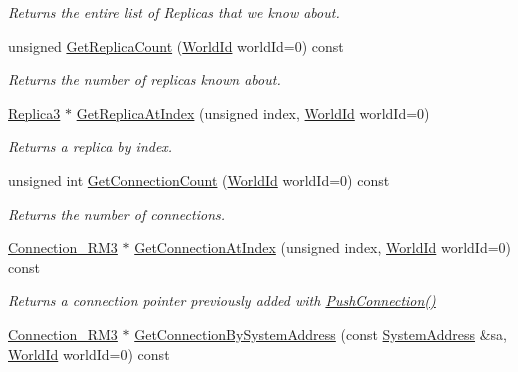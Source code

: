 \begin{DoxyCompactItemize}
\begin{DoxyCompactList}\small\item\em Returns the entire list of Replicas that we know about. \end{DoxyCompactList}\item 
unsigned \hyperlink{class_rak_net_1_1_replica_manager3_af15943bf2667aadeff0a2e7a7f79629f}{Get\-Replica\-Count} (\hyperlink{group___r_e_p_l_i_c_a___m_a_n_a_g_e_r___g_r_o_u_p3_ga44b59af8e882248f61aa41d8ace38bf7}{World\-Id} world\-Id=0) const 
\begin{DoxyCompactList}\small\item\em Returns the number of replicas known about. \end{DoxyCompactList}\item 
\hyperlink{class_rak_net_1_1_replica3}{Replica3} $\ast$ \hyperlink{class_rak_net_1_1_replica_manager3_ae090d01f6e02425ebca4c1988f309de7}{Get\-Replica\-At\-Index} (unsigned index, \hyperlink{group___r_e_p_l_i_c_a___m_a_n_a_g_e_r___g_r_o_u_p3_ga44b59af8e882248f61aa41d8ace38bf7}{World\-Id} world\-Id=0)
\begin{DoxyCompactList}\small\item\em Returns a replica by index. \end{DoxyCompactList}\item 
unsigned int \hyperlink{class_rak_net_1_1_replica_manager3_ad5335d9001f0ae1b0278f671eb455956}{Get\-Connection\-Count} (\hyperlink{group___r_e_p_l_i_c_a___m_a_n_a_g_e_r___g_r_o_u_p3_ga44b59af8e882248f61aa41d8ace38bf7}{World\-Id} world\-Id=0) const 
\begin{DoxyCompactList}\small\item\em Returns the number of connections. \end{DoxyCompactList}\item 
\hyperlink{class_rak_net_1_1_connection___r_m3}{Connection\-\_\-\-R\-M3} $\ast$ \hyperlink{class_rak_net_1_1_replica_manager3_a3f239e372b43f60bb27163ab5011fe17}{Get\-Connection\-At\-Index} (unsigned index, \hyperlink{group___r_e_p_l_i_c_a___m_a_n_a_g_e_r___g_r_o_u_p3_ga44b59af8e882248f61aa41d8ace38bf7}{World\-Id} world\-Id=0) const 
\begin{DoxyCompactList}\small\item\em Returns a connection pointer previously added with \hyperlink{class_rak_net_1_1_replica_manager3_a5497b1ce378391cd617cec81ce7d8b94}{Push\-Connection()} \end{DoxyCompactList}\item 
\hyperlink{class_rak_net_1_1_connection___r_m3}{Connection\-\_\-\-R\-M3} $\ast$ \hyperlink{class_rak_net_1_1_replica_manager3_ab2eb6fff3e5a71113442b75975801d70}{Get\-Connection\-By\-System\-Address} (const \hyperlink{struct_rak_net_1_1_system_address}{System\-Address} \&sa, \hyperlink{group___r_e_p_l_i_c_a___m_a_n_a_g_e_r___g_r_o_u_p3_ga44b59af8e882248f61aa41d8ace38bf7}{World\-Id} world\-Id=0) const 

\end{DoxyCompactItemize}
